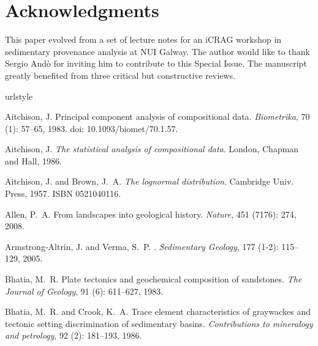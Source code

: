 \documentclass[11pt]{article}
\begin{document}
\section*{Acknowledgments}

This paper evolved from a set of lecture notes for an iCRAG workshop
in sedimentary provenance analysis at NUI Galway.  The author would
like to thank Sergio And\`{o} for inviting him to contribute to this
Special Issue. The manuscript greatly benefited from three critical
but constructive reviews.

%
%

\begin{thebibliography}{68}
\providecommand{\natexlab}[1]{#1}
\providecommand{\url}[1]{\texttt{#1}}
\expandafter\ifx\csname urlstyle\endcsname\relax
  \providecommand{\doi}[1]{doi: #1}\else
  \providecommand{\doi}{doi: \begingroup \urlstyle{rm}\Url}\fi

Aitchison, J.
\newblock Principal component analysis of compositional data.
\newblock \emph{Biometrika}, 70 (1): 57--65, 1983.
\newblock \doi{10.1093/biomet/70.1.57}.

Aitchison, J.
\newblock \emph{The statistical analysis of compositional data}.
\newblock London, Chapman and Hall, 1986.

Aitchison, J. and Brown, J.~A.
\newblock \emph{The lognormal distribution}.
\newblock Cambridge Univ. Press, 1957.
\newblock ISBN 0521040116.

Allen, P.~A.
\newblock From landscapes into geological history.
\newblock \emph{Nature}, 451 (7176): 274, 2008.

Armstrong-Altrin, J. and Verma, S.~P.
.
\newblock \emph{Sedimentary Geology}, 177 (1-2): 115--129,
  2005.

Bhatia, M.~R.
\newblock Plate tectonics and geochemical composition of sandstones.
\newblock \emph{The Journal of Geology}, 91 (6): 611--627,
  1983.

Bhatia, M.~R. and Crook, K.~A.
\newblock Trace element characteristics of graywackes and tectonic setting
  discrimination of sedimentary basins.
\newblock \emph{Contributions to mineralogy and petrology}, 92
  (2): 181--193, 1986.


\end{thebibliography}
\end{document}
